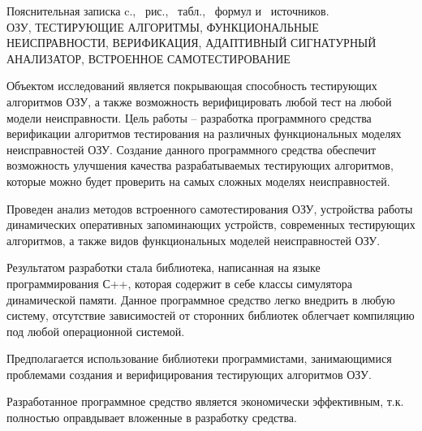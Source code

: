 \thispagestyle{empty}

\begin{center}
Пояснительная записка \pageref*{LastPage}c., \totfig{}~рис., \tottab{}~табл., \toteq{}~формул и \totref{}~источников.\\
\MakeUppercase{ОЗУ, тестирующие алгоритмы, функциональные неисправности, верификация, адаптивный сигнатурный анализатор, встроенное самотестирование}
\end{center}

Объектом исследований является покрывающая способность тестирующих алгоритмов ОЗУ, а также возможность верифицировать любой тест на любой модели неисправности.
Цель работы -- разработка программного средства верификации алгоритмов тестирования на различных функциональных моделях неисправностей ОЗУ.
Создание данного программного средства обеспечит возможность улучшения качества разрабатываемых тестирующих алгоритмов, которые можно будет проверить на самых сложных моделях неисправностей.

Проведен анализ методов встроенного самотестирования ОЗУ, устройства работы динамических оперативных запоминающих устройств, современных тестирующих алгоритмов, а также видов функциональных моделей неисправностей ОЗУ.

Результатом разработки стала библиотека, написанная на языке программирования С++, которая содержит в себе классы симулятора динамической памяти. Данное программное средство легко внедрить в любую систему, отсутствие зависимостей от сторонних библиотек облегчает компиляцию под любой операционной системой. 

Предполагается использование библиотеки программистами, занимающимися проблемами создания и верифицирования тестирующих алгоритмов ОЗУ.

Разработанное программное средство является экономически эффективным, т.к. полностью оправдывает вложенные в разработку средства. 

\clearpage
